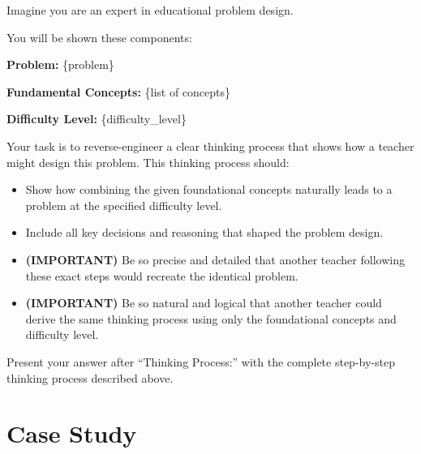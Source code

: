 \begin{tcolorbox}[colback=blue!5!white, colframe=blue!75!black, title=Rationale Generation Instruction]
Imagine you are an expert in educational problem design.

You will be shown these components:

\textbf{Problem:} \{problem\}

\textbf{Fundamental Concepts:} \{list of concepts\}

\textbf{Difficulty Level:} \{difficulty\_level\}

Your task is to reverse-engineer a clear thinking process that shows how a teacher might design this problem. This thinking process should:
\begin{itemize}
    \item Show how combining the given foundational concepts naturally leads to a problem at the specified difficulty level.
    \item Include all key decisions and reasoning that shaped the problem design.
    \item \textbf{(IMPORTANT)} Be so precise and detailed that another teacher following these exact steps would recreate the identical problem.
    \item \textbf{(IMPORTANT)} Be so natural and logical that another teacher could derive the same thinking process using only the foundational concepts and difficulty level.
\end{itemize}

Present your answer after ``Thinking Process:'' with the complete step-by-step thinking process described above.
\end{tcolorbox}


\section{Case Study}




